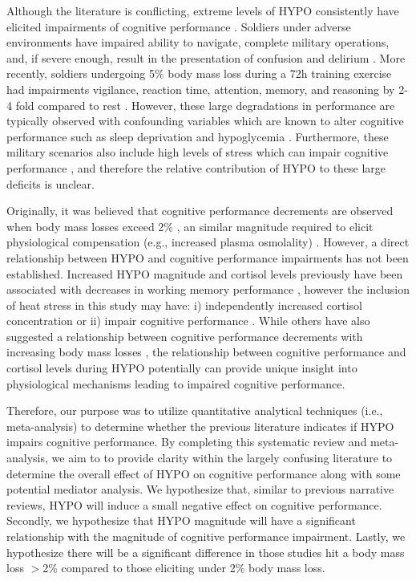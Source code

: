 Although the literature is conflicting, extreme levels of HYPO consistently have elicited impairments of cognitive performance \cite{king_brief_1878, adolf_physiology_1947}. Soldiers under adverse environments have impaired ability to navigate, complete military operations, and, if severe enough, result in the presentation of confusion and delirium \cite{king_brief_1878,adolf_physiology_1947}. More recently, soldiers undergoing 5\% body mass loss during a 72h training exercise had impairments vigilance, reaction time, attention, memory, and reasoning by 2-4 fold compared to rest \cite{lieberman_severe_2005}. However, these large degradations in performance are typically observed with confounding variables which are known to alter cognitive performance such as sleep deprivation \cite{krause_sleep-deprived_2017} and hypoglycemia \cite{strachan_acute_2001}. Furthermore, these military scenarios also include high levels of stress which can impair cognitive performance \cite{opstad_performance_1978}, and therefore the relative contribution of HYPO to these large deficits is unclear. 

Originally, it was believed that cognitive performance decrements are observed when body mass losses exceed 2\% \cite{gopinathan_role_1988,sharma_influence_1986,sharma_differential_1983}, an similar magnitude required to elicit physiological compensation (e.g., increased plasma osmolality) \cite{cheuvront_dehydration:_2014}. However, a direct relationship between HYPO and cognitive performance impairments has not been established. Increased HYPO magnitude and cortisol levels previously have been associated with decreases in working memory performance \cite{mcmorris_heat_2006}, however the inclusion of heat stress in this study may have: i) independently increased cortisol concentration or ii) impair cognitive performance \cite{hancock_effects_2003}. While others have also suggested a relationship between cognitive performance decrements with increasing body mass losses \cite{gopinathan_role_1988}, the relationship between cognitive performance and cortisol levels during HYPO potentially can provide unique insight into physiological mechanisms leading to impaired cognitive performance. 

Therefore, our purpose was to utilize quantitative analytical techniques (i.e., meta-analysis) to determine whether the previous literature indicates if HYPO impairs cognitive performance. By completing this systematic review and meta-analysis, we aim to to provide clarity within the largely confusing literature to determine the overall effect of HYPO on cognitive performance along with some potential mediator analysis. We hypothesize that, similar to previous narrative reviews, HYPO will induce a small negative effect on cognitive performance. Secondly, we hypothesize that HYPO magnitude will have a significant relationship with the magnitude of cognitive performance impairment. Lastly, we hypothesize there will be a significant difference in those studies hit a body mass loss ${>}$2\% compared to those eliciting under 2\% body mass loss.  
 
